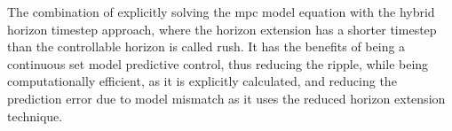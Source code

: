 The combination of explicitly solving the \gls{mpc} model equation with the hybrid horizon timestep approach, where the horizon extension has a shorter timestep than the controllable horizon is called \acrfull{rush}. It has the benefits of being a continuous set model predictive control, thus reducing the ripple, while being computationally efficient, as it is explicitly calculated, and reducing the prediction error due to model mismatch as it uses the reduced horizon extension technique.

